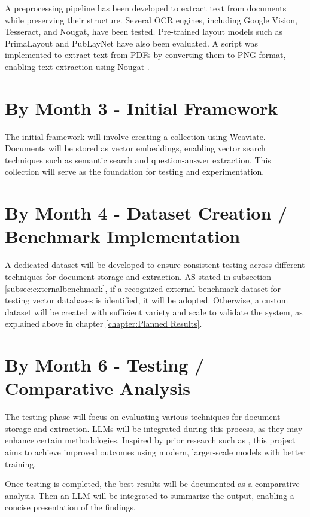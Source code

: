 A preprocessing pipeline has been developed to extract text from documents while preserving their structure. Several OCR engines, including Google Vision, Tesseract, and Nougat, have been tested. Pre-trained layout models such as PrimaLayout and PubLayNet have also been evaluated. A script was implemented to extract text from PDFs by converting them to PNG format, enabling text extraction using Nougat \cite{blecher2023nougatneuralopticalunderstanding}.

\section{By Month 3 - Initial Framework}

The initial framework will involve creating a collection using Weaviate. Documents will be stored as vector embeddings, enabling vector search techniques such as semantic search and question-answer extraction. This collection will serve as the foundation for testing and experimentation.

\section{By Month 4 - Dataset Creation / Benchmark Implementation}
\label{sec:datasetcreation}
A dedicated dataset will be developed to ensure consistent testing across different techniques for document storage and extraction. AS stated in subsection \ref{subsec:externalbenchmark}, if a recognized external benchmark dataset  for testing vector databases is identified, it will be adopted. Otherwise, a custom dataset will be created with sufficient variety and scale to validate the system, as explained above in chapter \ref{chapter:Planned Results}.

\section{By Month 6 - Testing / Comparative Analysis}

The testing phase will focus on evaluating various techniques for document storage and extraction. \ac{LLM}s will be integrated during this process, as they may enhance certain methodologies. Inspired by prior research such as \cite{densepassageretrievalopendomainkarpukhin2020}, this project aims to achieve improved outcomes using modern, larger-scale models with better training.

Once testing is completed, the best results will be documented as a comparative analysis. Then an \ac{LLM} will be integrated to summarize the output, enabling a concise presentation of the findings.

